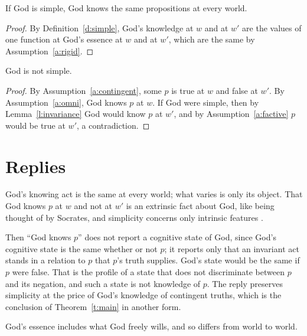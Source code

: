 \documentclass{situationist-preprint}
\begin{document}
\begin{lemma}\label{l:invariance}
If God is simple, God knows the same propositions at every world.
\end{lemma}

\begin{proof}
By Definition~\ref{d:simple}, God's knowledge at $w$ and at $w'$ are the values of one function at God's essence at $w$ and at $w'$, which are the same by Assumption~\ref{a:rigid}.
\end{proof}

\begin{theorem}\label{t:main}
God is not simple.
\end{theorem}

\begin{proof}
By Assumption~\ref{a:contingent}, some $p$ is true at $w$ and false at $w'$. By Assumption~\ref{a:omni}, God knows $p$ at $w$. If God were simple, then by Lemma~\ref{l:invariance} God would know $p$ at $w'$, and by Assumption~\ref{a:factive} $p$ would be true at $w'$, a contradiction.
\end{proof}

\section{Replies}

\begin{objection}
God's knowing act is the same at every world; what varies is only its object. That God knows $p$ at $w$ and not at $w'$ is an extrinsic fact about God, like being thought of by Socrates, and simplicity concerns only intrinsic features \citep{StumpKretzmann1985,Brower2008}.
\end{objection}

\begin{reply}
Then \enquote{God knows $p$} does not report a cognitive state of God, since God's cognitive state is the same whether or not $p$; it reports only that an invariant act stands in a relation to $p$ that $p$'s truth supplies. God's state would be the same if $p$ were false. That is the profile of a state that does not discriminate between $p$ and its negation, and such a state is not knowledge of $p$. The reply preserves simplicity at the price of God's knowledge of contingent truths, which is the conclusion of Theorem~\ref{t:main} in another form.
\end{reply}

\begin{objection}
God's essence includes what God freely wills, and so differs from world to world.
\end{objection}
\end{document}
